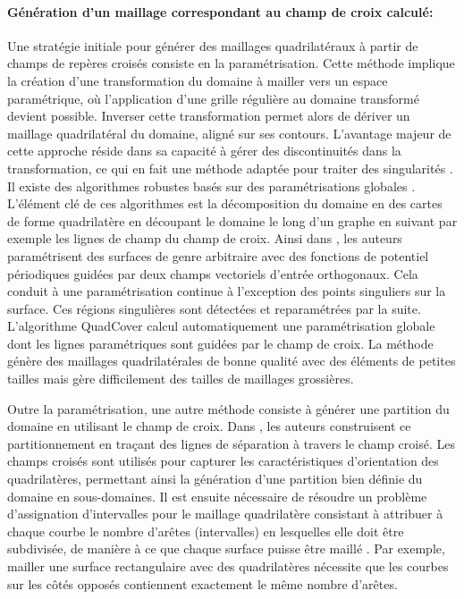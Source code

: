 \paragraph{Génération d'un maillage correspondant au champ de croix calculé:}

Une stratégie initiale pour générer des maillages quadrilatéraux à partir de champs de repères croisés consiste en la paramétrisation. Cette méthode implique la création d'une transformation du domaine à mailler vers un espace paramétrique, où l'application d'une grille régulière au domaine transformé devient possible. Inverser cette transformation permet alors de dériver un maillage quadrilatéral du domaine, aligné sur ses contours. L'avantage majeur de cette approche réside dans sa capacité à gérer des discontinuités dans la transformation, ce qui en fait une méthode adaptée pour traiter des singularités \cite{reberol2018maillages}. Il existe des algorithmes robustes basés sur des paramétrisations globales \cite{ray2006periodic, kalberer2007quadcover, myles2014robust, campen2015quantized}. L'élément clé de ces algorithmes est la décomposition du domaine en des cartes de forme quadrilatère en découpant le domaine le long d'un graphe en suivant par exemple les lignes de champ du champ de croix. Ainsi dans \cite{ray2006periodic}, les auteurs paramétrisent des surfaces de genre arbitraire avec des fonctions de potentiel périodiques guidées par deux champs vectoriels d'entrée orthogonaux. Cela conduit à une paramétrisation continue à l'exception des points singuliers sur la surface. Ces régions singulières sont détectées et reparamétrées par la suite. L'algorithme QuadCover \cite{kalberer2007quadcover} calcul automatiquement une paramétrisation globale dont les lignes paramétriques sont guidées par le champ de croix. La méthode génère des maillages quadrilatérales de bonne qualité avec des éléments de petites tailles mais gère difficilement des tailles de maillages grossières.

Outre la paramétrisation, une autre méthode consiste à générer une partition du domaine en utilisant le champ de croix.  Dans \cite{kowalski2013pde}, les auteurs construisent ce partitionnement en traçant des lignes de séparation à travers le champ croisé. Les champs croisés sont utilisés pour capturer les caractéristiques d'orientation des quadrilatères, permettant ainsi la génération d'une partition bien définie du domaine en sous-domaines. Il est ensuite nécessaire de résoudre un problème d'assignation d'intervalles pour le maillage quadrilatère consistant à attribuer à chaque courbe le nombre d'arêtes (intervalles) en lesquelles elle doit être subdivisée, de manière à ce que chaque surface  puisse être maillé \cite{hohring1997mesh, mitchell2000high, mitchell2014simple}. Par exemple, mailler une surface rectangulaire avec des quadrilatères nécessite que les courbes sur les côtés opposés contiennent exactement le même nombre d'arêtes. 


